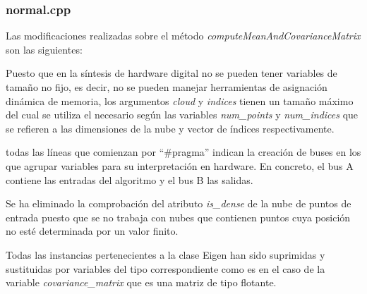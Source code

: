 \subsubsection{normal.cpp}

Las modificaciones realizadas sobre el método \textit{computeMeanAndCovarianceMatrix} son las siguientes:

\begin{list}{•}
\item Puesto que en la síntesis de hardware digital no se pueden tener variables de tamaño no fijo, es decir, no se pueden manejar herramientas de asignación dinámica de memoria, los argumentos \textit{cloud} y \textit{indices} tienen un tamaño máximo del cual se utiliza el necesario según las variables \textit{num\_points} y \textit{num\_indices} que se refieren a las dimensiones de la nube y vector de índices respectivamente.
\item todas las líneas que comienzan por ``\#pragma'' indican la creación de buses en los que agrupar variables para su interpretación en hardware. En concreto, el bus A contiene las entradas del algoritmo y el bus B las salidas. 

\item Se ha eliminado la comprobación del atributo \textit{is\_dense} de la nube de puntos de entrada puesto que se no trabaja con nubes que contienen puntos cuya posición no esté determinada por un valor finito.

\item Todas las instancias pertenecientes a la clase Eigen han sido suprimidas y sustituidas por variables del tipo correspondiente como es en el caso de la variable \textit{covariance\_matrix} que es una matriz de tipo flotante.

\end{list}

